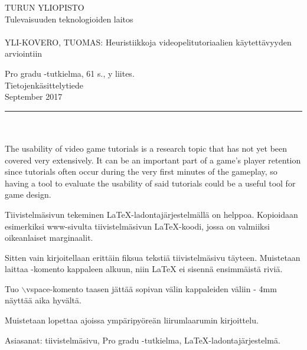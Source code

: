 \documentclass[12pt, a4paper]{report}
\begin{document}
\begin{minipage}{15cm}
	\noindent
	TURUN YLIOPISTO\\
	Tulevaisuuden teknologioiden laitos\\
	\\
	YLI-KOVERO, TUOMAS: Heuristiikkoja videopelitutoriaalien käytettävyyden arviointiin
	
	Pro gradu -tutkielma, 61 s., y liites.\\
	Tietojenkäsittelytiede\\	
	September 2017\\
	\rule{\textwidth}{.2mm}\\
	\\
	The usability of video game tutorials is a research topic that has not yet been covered very extensively. It can be an important part of a game's player retention since tutorials often occur during the very first minutes of the gameplay, so having a tool to evaluate the usability of said tutorials could be a useful tool for game design.
	
	Tiivistelmäsivun tekeminen LaTeX-ladontajärjestelmällä on helppoa. Kopioidaan esimerkiksi www-sivulta tiivistelmäsivun LaTeX-koodi, jossa on valmiiksi oikeanlaiset marginaalit.
	
	\vspace{4mm}\noindent Sitten vain kirjoitellaan erittäin fiksua tekstiä tiivistelmäsivu täyteen. Muistetaan laittaa \noindent-komento kappaleen
	alkuun, niin LaTeX ei sisennä ensimmäistä riviä.
	
	\vspace{4mm}\noindent Tuo $\backslash$vspace-komento taasen jättää sopivan välin kappaleiden väliin - 4mm näyttää aika hyvältä.
	
	\vspace{4mm}\noindent Muistetaan lopettaa ajoissa ympäripyöreän liirumlaarumin kirjoittelu.
	
	\vspace{4mm}\noindent Asiasanat: tiivistelmäsivu, Pro gradu -tutkielma, LaTeX-ladontajärjestelmä.
	
\end{minipage}
\cleardoublepage
{}
\tableofcontents
\cleardoublepage
{}
\pagestyle{plain} 
\setcounter{page}{1}











\end{document}

